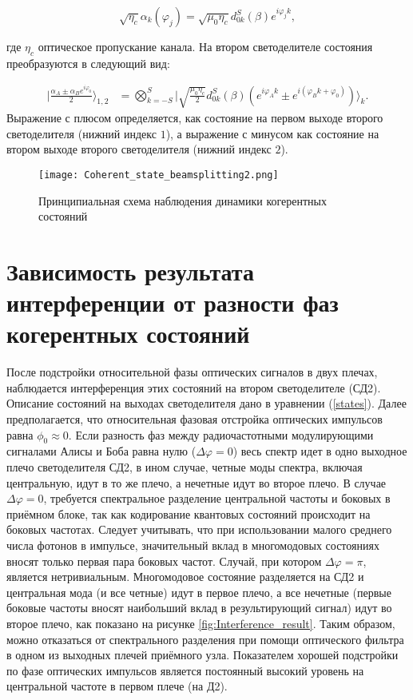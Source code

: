 \begin{equation}
\sqrt{\eta_c}\alpha_k(\varphi_j)=\sqrt{\mu_0\eta_c}d^S_{0k}(\beta)e^{i\varphi_jk},
\end{equation}


где $\eta_c$ оптическое пропускание канала. На втором светоделителе состояния преобразуются в следующий вид: 

\begin{align}\label{states}
\Big|\frac{\alpha_A \pm \alpha_Be^{i\varphi_0}}{2}\Big\rangle_{1,2} &= \bigotimes_{k=-S}^{S}\Big|\sqrt{\frac{\mu_0\eta_c}{2}}d_{0k}^{S}(\beta)\left(e^{i\varphi_Ak}\pm e^{i(\varphi_Bk+\varphi_0)}\right)\Big\rangle_k.
\end{align}
Выражение с плюсом определяется, как состояние на первом выходе второго светоделителя (нижний индекс $1$), а выражение с минусом как состояние на втором выходе второго светоделителя (нижний индекс  $2$). 
 
\begin{figure}[ht]
 \centering
  \texttt{[image: Coherent\_state\_beamsplitting2.png]}
  \caption{Принципиальная схема наблюдения динамики когерентных состояний}
  \label{fig:Coherent_states_beamsplitting2}
\end{figure}

\pagebreak

\section{Зависимость результата интерференции от разности фаз когерентных состояний} \label{ch:ch4/sec7}

После подстройки относительной фазы оптических сигналов в двух плечах, наблюдается интерференция этих состояний на втором светоделителе (СД2). Описание состояний на выходах светоделителя дано в уравнении (\ref{states}). Далее предполагается, что относительная фазовая отстройка оптических импульсов равна $\phi_0\approx0$. Если разность фаз между радиочастотными модулирующими сигналами Алисы и Боба равна нулю ($\Delta\varphi=0$) весь спектр идет в одно выходное плечо светоделителя СД2, в ином случае, четные моды спектра, включая центральную, идут в то же плечо, а нечетные идут во второе плечо. В случае $\Delta\varphi=0$, требуется спектральное разделение центральной частоты и боковых в приёмном блоке, так как кодирование квантовых состояний происходит на боковых частотах. Следует учитывать, что при использовании малого среднего числа фотонов в импульсе, значительный вклад в многомодовых состояниях вносят только первая пара боковых частот. Случай, при котором $\Delta\varphi=\pi$, является нетривиальным. Многомодовое состояние разделяется на СД2 и центральная мода (и все четные) идут в первое плечо, а все нечетные (первые боковые частоты вносят наибольший вклад в результирующий сигнал) идут во второе плечо, как показано на рисунке \ref{fig:Interference_result}. Таким образом, можно отказаться от спектрального разделения при помощи оптического фильтра в одном из выходных плечей приёмного узла. Показателем хорошей подстройки по фазе оптических импульсов является постоянный высокий уровень на центральной частоте в первом плече (на Д2).  


